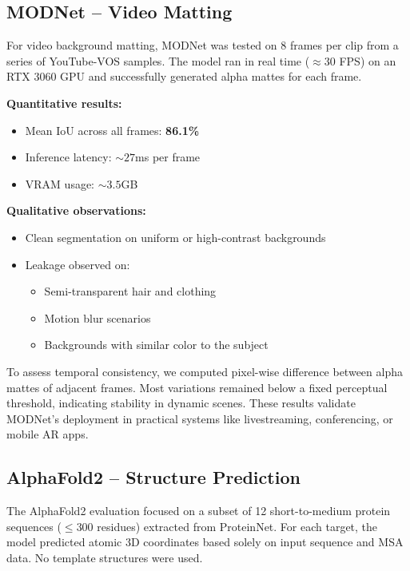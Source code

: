 \documentclass{article}
\begin{document}
\subsection{MODNet – Video Matting}

For video background matting, MODNet was tested on 8 frames per clip from a series of YouTube-VOS samples. The model ran in real time ($\approx30$ FPS) on an RTX 3060 GPU and successfully generated alpha mattes for each frame.

\textbf{Quantitative results:}
\begin{itemize}
  \item Mean IoU across all frames: \textbf{86.1\%}
  \item Inference latency: $\sim27$ms per frame
  \item VRAM usage: $\sim3.5$GB
\end{itemize}

\textbf{Qualitative observations:}
\begin{itemize}
  \item Clean segmentation on uniform or high-contrast backgrounds
  \item Leakage observed on:
    \begin{itemize}
      \item Semi-transparent hair and clothing
      \item Motion blur scenarios
      \item Backgrounds with similar color to the subject
    \end{itemize}
\end{itemize}

To assess temporal consistency, we computed pixel-wise difference between alpha mattes of adjacent frames. Most variations remained below a fixed perceptual threshold, indicating stability in dynamic scenes. These results validate MODNet’s deployment in practical systems like livestreaming, conferencing, or mobile AR apps.

\subsection{AlphaFold2 – Structure Prediction}

The AlphaFold2 evaluation focused on a subset of 12 short-to-medium protein sequences ($\leq300$ residues) extracted from ProteinNet. For each target, the model predicted atomic 3D coordinates based solely on input sequence and MSA data. No template structures were used.
\end{document}
